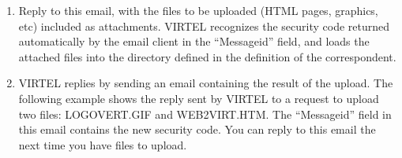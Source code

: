\documentclass[letterpaper,10pt,english]{sphinxmanual}
\begin{document}
\begin{sphinxVerbatim}[commandchars=\\\{\}]
      
 
  
 
     
 
        
\end{sphinxVerbatim}

\sphinxAtStartPar
{}
\begin{enumerate}
%
\setcounter{enumi}{1}
\item {} 
\sphinxAtStartPar
Reply to this e\sphinxhyphen{}mail, with the files to be uploaded (HTML pages, graphics, etc) included as attachments. VIRTEL recognizes the security code returned automatically by the e\sphinxhyphen{}mail client in the “Message\sphinxhyphen{}id” field, and loads the attached files into the directory defined in the definition of the correspondent.

\item {} 
\sphinxAtStartPar
VIRTEL replies by sending an e\sphinxhyphen{}mail containing the result of the upload. The following example shows the reply sent by VIRTEL to a request to upload two files: LOGOVERT.GIF and WEB2VIRT.HTM. The “Message\sphinxhyphen{}id” field in this e\sphinxhyphen{}mail contains the new security code. You can reply to this e\sphinxhyphen{}mail the next time you have files to upload.

\end{enumerate}
\end{document}
